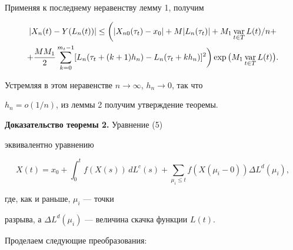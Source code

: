 Применяя к последнему неравенству лемму 1, получим


\begin{gather*}


|X_n(t)-Y(L_n(t))| \leq \bigg(| X_{n0}(\tau_t)- x_0|+


M|L_n(\tau_t)|+ M_1\var_{t\in T} L(t)/n+ \\


+\frac{MM_1}{2} \sum_{k=0}^{m_t-1}[ L_n(\tau_t+(k+1)h_n)-


L_n(\tau_t+kh_n)]^2\bigg) \exp \big(M_1 \var_{t\in T}L(t)\big).


\end{gather*}


Устремляя в этом неравенстве $n \to \infty$, $h_n \to 0$, так что


$h_n=o(1/n)$, из леммы 2 получим утверждение теоремы.


\medskip





{\bf Доказательство теоремы 2.} Уравнение (5)


эквивалентно уравнению


$$


X(t)=x_0+\int_0^tf(X(s))\,dL^c(s)+


\sum_{\mu_i \leq t}f(X(\mu_i-0))\Delta L^d(\mu_i),


$$


где, как и раньше, $\mu_i $ --- точки


разрыва, а $\Delta L^d(\mu_i)$ --- величина скачка функции $L(t)$.





Проделаем следующие преобразования:


